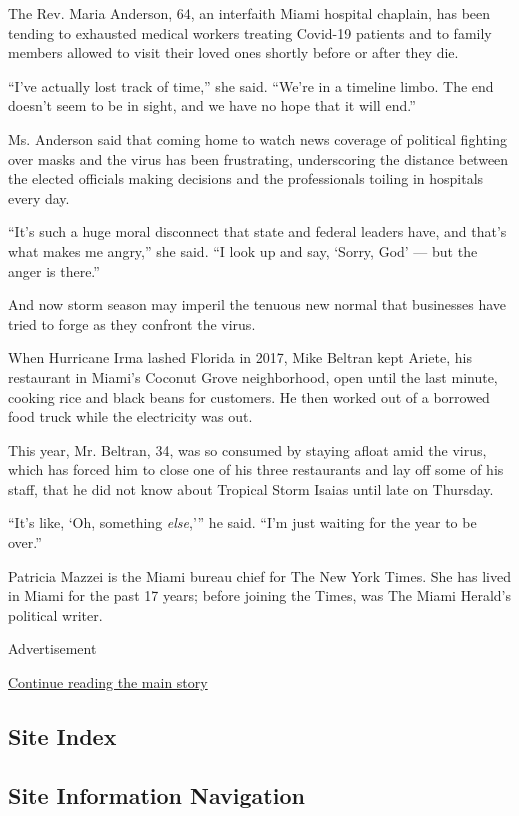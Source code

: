 The Rev. Maria Anderson, 64, an interfaith Miami hospital chaplain, has
been tending to exhausted medical workers treating Covid-19 patients and
to family members allowed to visit their loved ones shortly before or
after they die.

``I've actually lost track of time,'' she said. ``We're in a timeline
limbo. The end doesn't seem to be in sight, and we have no hope that it
will end.''

Ms. Anderson said that coming home to watch news coverage of political
fighting over masks and the virus has been frustrating, underscoring the
distance between the elected officials making decisions and the
professionals toiling in hospitals every day.

``It's such a huge moral disconnect that state and federal leaders have,
and that's what makes me angry,'' she said. ``I look up and say, `Sorry,
God' --- but the anger is there.''

And now storm season may imperil the tenuous new normal that businesses
have tried to forge as they confront the virus.

When Hurricane Irma lashed Florida in 2017, Mike Beltran kept Ariete,
his restaurant in Miami's Coconut Grove neighborhood, open until the
last minute, cooking rice and black beans for customers. He then worked
out of a borrowed food truck while the electricity was out.

This year, Mr. Beltran, 34, was so consumed by staying afloat amid the
virus, which has forced him to close one of his three restaurants and
lay off some of his staff, that he did not know about Tropical Storm
Isaias until late on Thursday.

``It's like, `Oh, something \emph{else},''' he said. ``I'm just waiting
for the year to be over.''

Patricia Mazzei is the Miami bureau chief for The New York Times. She
has lived in Miami for the past 17 years; before joining the Times, was
The Miami Herald's political writer.

Advertisement

\protect\hyperlink{after-bottom}{Continue reading the main story}

\hypertarget{site-index}{%
\subsection{Site Index}\label{site-index}}

\hypertarget{site-information-navigation}{%
\subsection{Site Information
Navigation}\label{site-information-navigation}}

